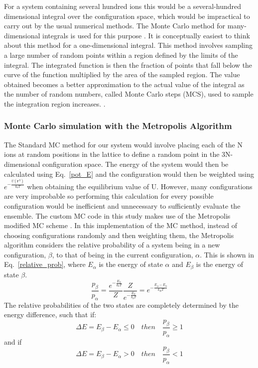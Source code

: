 \documentclass[11pt, twoside]{report}
\begin{document}
For a system containing several hundred ions this would be a several-hundred dimensional integral over the configuration space, which would be impractical to carry out by the usual numerical methods. The Monte Carlo method for many-dimensional integrals is used for this purpose \cite{Metropolis}. It is conceptually easiest to think about this method for a one-dimensional integral. This method involves sampling a large number of random points within a region defined by the limits of the integral. The integrated function is then the fraction of points that fall below the curve of the function multiplied by the area of the sampled region. The value obtained becomes a better approximation to the actual value of the integral as the number of random numbers, called Monte Carlo steps (MCS), used to sample the integration region increases. \cite{Lesar3}.


\subsubsection{Monte Carlo simulation with the Metropolis Algorithm }
The Standard MC method for our system would involve placing each of the N ions at random positions in the lattice to define a random point in the 3N-dimensional configuration space. The energy of the system would then be calculated using Eq.~\ref{pot_E} and the configuration would then be weighted using $e^{-\frac{U(\mathbf{r}^N)}{k_bT}}$ when obtaining the equilibrium value of U. However, many configurations are very improbable so performing this calculation for every possible configuration would be inefficient and unnecessary to sufficiently evaluate the ensemble. The custom MC code in this study makes use of the Metropolis modified MC scheme \cite{Metropolis}. In this implementation of the MC method, instead of choosing configurations randomly and then weighting them, the Metropolis algorithm considers the relative probability of a system being in a new configuration, $\beta$, to that of being in the current configuration, $\alpha$. This is shown in Eq.~\ref{relative_prob}, where $E_\alpha$ is the energy of state $\alpha$ and $E_\beta$ is the energy of state $\beta$.
\begin{equation}\label{relative_prob}
\frac{p_\beta}{p_\alpha} = \frac{  e^{-\frac{E_\alpha}{k_bT}} }{Z} \frac{Z}{  e^{-\frac{E_\alpha}{k_bT}} } = e^{- \frac{E_\beta - E_\alpha}{k_BT}}
\end{equation}
The relative probabilities of the two states are completely determined by the energy 
difference, such that if:
\begin{equation}\label{met}
\Delta E = E_{\beta} - E_{\alpha} \leq 0    \quad  then  \quad   \frac{p_{\beta}}{p_{\alpha}} \geq 1 
\end{equation}
and if
\begin{equation}\label{met2}
\Delta E = E_{\beta} - E_{\alpha} > 0   \quad   then   \quad   \frac{p_{\beta}}{p_{\alpha}} < 1
\end{equation}
\end{document}
